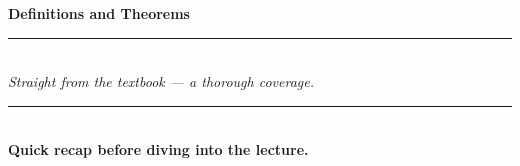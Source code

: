 \begin{titlepage}
    \null %
    \vfill
    \begin{center}
        {\Huge \textbf{Definitions and Theorems}} \\[20pt]
        \rule{\textwidth}{0.5mm} \\[15pt]
        {\Large \textit{Straight from the textbook — a thorough coverage.}} \\[15pt]
        \rule{\textwidth}{0.5mm} \\[15pt]
        \textbf{Quick recap before diving into the lecture.}
    \end{center}
    \vfill
\end{titlepage}
